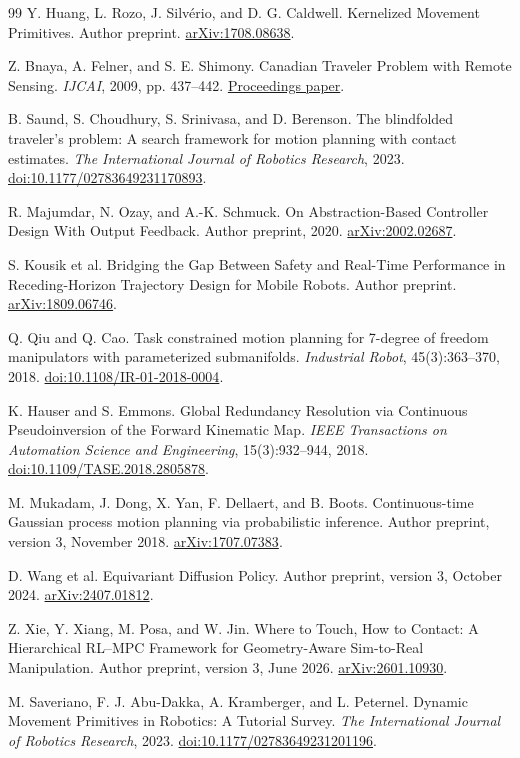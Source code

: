 \documentclass[11pt,a4paper]{article}
\theoremstyle{cn}
\begin{document}
\begin{thebibliography}{99}
Y. Huang, L. Rozo, J. Silvério, and D. G. Caldwell.
Kernelized Movement Primitives.
Author preprint.
\href{https://arxiv.org/abs/1708.08638}{arXiv:1708.08638}.

Z. Bnaya, A. Felner, and S. E. Shimony.
Canadian Traveler Problem with Remote Sensing.
\emph{IJCAI}, 2009, pp. 437--442.
\href{https://www.ijcai.org/Proceedings/09/Papers/080.pdf}{Proceedings paper}.

B. Saund, S. Choudhury, S. Srinivasa, and D. Berenson.
The blindfolded traveler's problem: A search framework for motion planning with contact estimates.
\emph{The International Journal of Robotics Research}, 2023.
\href{https://doi.org/10.1177/02783649231170893}{doi:10.1177/02783649231170893}.

R. Majumdar, N. Ozay, and A.-K. Schmuck.
On Abstraction-Based Controller Design With Output Feedback.
Author preprint, 2020.
\href{https://arxiv.org/abs/2002.02687}{arXiv:2002.02687}.

S. Kousik et al.
Bridging the Gap Between Safety and Real-Time Performance in Receding-Horizon Trajectory Design for Mobile Robots.
Author preprint.
\href{https://arxiv.org/abs/1809.06746}{arXiv:1809.06746}.

Q. Qiu and Q. Cao.
Task constrained motion planning for 7-degree of freedom manipulators with parameterized submanifolds.
\emph{Industrial Robot}, 45(3):363--370, 2018.
\href{https://doi.org/10.1108/IR-01-2018-0004}{doi:10.1108/IR-01-2018-0004}.

K. Hauser and S. Emmons.
Global Redundancy Resolution via Continuous Pseudoinversion of the Forward Kinematic Map.
\emph{IEEE Transactions on Automation Science and Engineering}, 15(3):932--944, 2018.
\href{https://doi.org/10.1109/TASE.2018.2805878}{doi:10.1109/TASE.2018.2805878}.


M. Mukadam, J. Dong, X. Yan, F. Dellaert, and B. Boots.
Continuous-time Gaussian process motion planning via probabilistic inference.
Author preprint, version 3, November 2018.
\href{https://arxiv.org/abs/1707.07383}{arXiv:1707.07383}.

D. Wang et al.
Equivariant Diffusion Policy.
Author preprint, version 3, October 2024.
\href{https://arxiv.org/abs/2407.01812}{arXiv:2407.01812}.

Z. Xie, Y. Xiang, M. Posa, and W. Jin.
Where to Touch, How to Contact: A Hierarchical RL--MPC Framework for Geometry-Aware Sim-to-Real Manipulation.
Author preprint, version 3, June 2026.
\href{https://arxiv.org/abs/2601.10930}{arXiv:2601.10930}.

M. Saveriano, F. J. Abu-Dakka, A. Kramberger, and L. Peternel.
Dynamic Movement Primitives in Robotics: A Tutorial Survey.
\emph{The International Journal of Robotics Research}, 2023.
\href{https://doi.org/10.1177/02783649231201196}{doi:10.1177/02783649231201196}.

\end{thebibliography}
\end{document}
